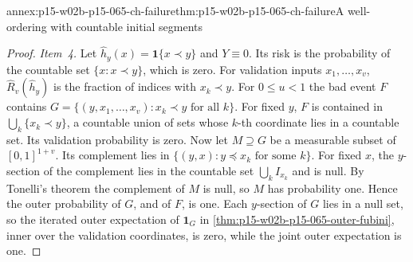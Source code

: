\begin{annexitem}{annex:p15-w02b-p15-065-ch-failure}{thm:p15-w02b-p15-065-ch-failure}{A well-ordering with countable initial segments}
\begin{proof}
\emph{Item~4.} Let \(\widehat h_y(x)=\mathbf1\{x\prec y\}\) and
\(Y\equiv0\). Its risk is the probability of the countable set
\(\{x:x\prec y\}\), which is zero. For validation inputs
\(x_1,\ldots,x_v\), \(\widehat R_v(\widehat h_y)\) is the fraction of
indices with \(x_k\prec y\). For \(0\leq u<1\) the bad event \(F\) contains
\(G=\{(y,x_1,\ldots,x_v):x_k\prec y\text{ for all }k\}\). For fixed \(y\),
\(F\) is contained in \(\bigcup_k\{x_k\prec y\}\), a countable union of sets
whose \(k\)-th coordinate lies in a countable set. Its validation
probability is zero. Now let \(M\supseteq G\) be a measurable subset of
\([0,1]^{1+v}\). Its complement lies in
\(\{(y,x):y\preceq x_k\text{ for some }k\}\). For fixed \(x\), the
\(y\)-section of the complement lies in the countable set
\(\bigcup_kI_{x_k}\) and is null. By Tonelli's theorem the complement of
\(M\) is null, so \(M\) has probability one. Hence the outer probability of
\(G\), and of \(F\), is one. Each \(y\)-section of \(G\) lies in a null set,
so the iterated outer expectation of \(\mathbf1_G\) in
\cref{thm:p15-w02b-p15-065-outer-fubini}, inner over the validation
coordinates, is zero, while the joint outer expectation is one.
\end{proof}
\end{annexitem}

